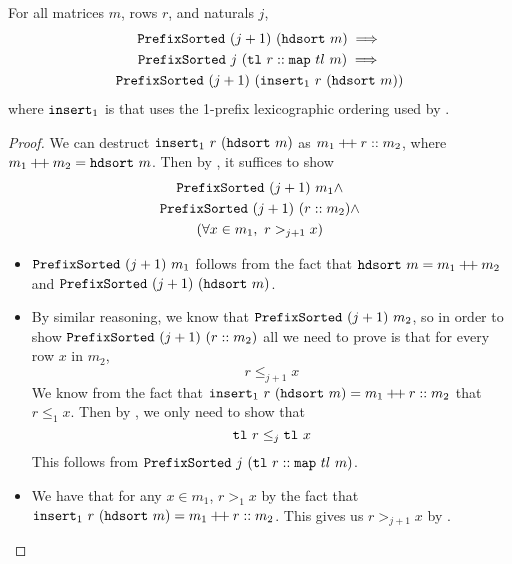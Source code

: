 \documentclass[sigplan,10pt,anonymous,review]{thesis}
\begin{document}
\section{}
\label{appendix:hdsort_sorted_S}

\begin{lemma}
  For all matrices $m$, rows $r$, and naturals $j$,
  \begin{gather*}
    \texttt{PrefixSorted}~(j+1)~(\texttt{hdsort}~m) \implies \\
    \texttt{PrefixSorted}~j~(\texttt{tl}~r :: \texttt{map}~{tl}~m) \implies \\
    \texttt{PrefixSorted}~(j+1)~(\texttt{insert}_1~r~(\texttt{hdsort}~m))
  \end{gather*}
  where $\texttt{insert}_1$ is  that uses the 1-prefix
  lexicographic ordering used by .
\end{lemma}
\begin{proof}
  We can destruct $\texttt{insert}_1~r~(\texttt{hdsort}~m)$ as $m_1 \mathbin{+\mkern-3mu+} r
  :: m_2$, where $m_1 \mathbin{+\mkern-3mu+} m_2 = \texttt{hdsort}~m$. Then by
  , it suffices to show
  \begin{gather*}
    \texttt{PrefixSorted}~(j+1)~m_1 \land \\
    \texttt{PrefixSorted}~(j+1)~(r :: m_2) \land \\
    (\forall x \in m_1,~ r >_{j+1} x)
  \end{gather*}
  \begin{itemize}
  \item $\texttt{PrefixSorted}~(j+1)~m_1$ follows from the fact that
    $\texttt{hdsort}~m = m_1 \mathbin{+\mkern-3mu+} m_2$ and
    $\texttt{PrefixSorted}~(j+1)~(\texttt{hdsort}~m)$.
  \item By similar reasoning, we know that
    $\texttt{PrefixSorted}~(j+1)~m_2$, so in order to show
    $\texttt{PrefixSorted}~(j+1)~(r :: m_2)$ all we need to prove is that
    for every row $x$ in $m_2$,
    \begin{equation*}
      r \le_{j+1} x
    \end{equation*}
    We know from the fact that $\texttt{insert}_1~r~(\texttt{hdsort}~m) =
    m_1 \mathbin{+\mkern-3mu+} r :: m_2$ that $r \le_1 x$. Then by ,
    we only need to show that
    \begin{equation*}
      \texttt{tl}~r \le_j \texttt{tl}~x
    \end{equation*}
    This follows from $\texttt{PrefixSorted}~j~(\texttt{tl}~r :: \texttt{map}~{tl}~m)$.
  \item We have that for any $x \in m_1$, $r >_1 x$ by the fact that
    $\texttt{insert}_1~r~(\texttt{hdsort}~m) = m_1 \mathbin{+\mkern-3mu+} r :: m_2$. This
    gives us $r >_{j+1} x$ by . \qedhere
  \end{itemize}
\end{proof}
\end{document}
